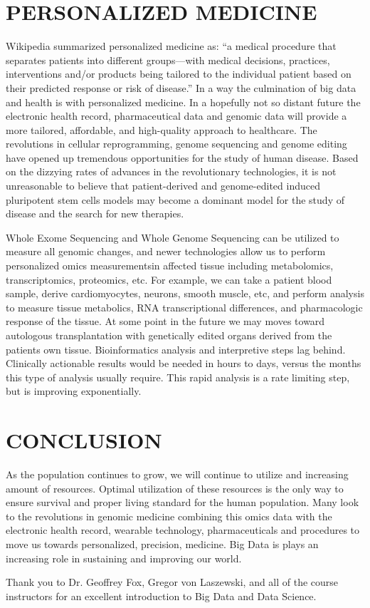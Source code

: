\documentclass[sigconf]{acmart}
\begin{document}
\section{PERSONALIZED MEDICINE}

Wikipedia summarized personalized medicine as: ``a medical
procedure that separates patients into different groups—with medical
decisions, practices, interventions and/or products being tailored to
the individual patient based on their predicted response or risk of
disease.''  \cite{wiki-personalized} In a way the culmination of big
data and health is with personalized medicine.  In a hopefully not so
distant future the electronic health record, pharmaceutical data and
genomic data will provide a more tailored, affordable, and
high-quality approach to healthcare. 
The revolutions in cellular reprogramming, genome sequencing and genome editing have opened up tremendous opportunities for the study of human disease.  Based on the dizzying rates of advances in the  revolutionary technologies, it is not unreasonable to believe that patient-derived and genome-edited  induced pluripotent stem cells models may become a dominant model for the study of  disease and the search for new therapies.

Whole Exome Sequencing and Whole Genome Sequencing  can be utilized to measure all genomic changes, and newer technologies allow us to perform personalized omics measurementsin affected tissue including metabolomics, transcriptomics, proteomics, etc.  For example, we can take a patient blood sample, derive cardiomyocytes, neurons, smooth muscle, etc, and perform analysis to measure tissue metabolics, RNA transcriptional differences, and pharmacologic response of the tissue. At some point in the future we may moves toward autologous transplantation with genetically edited organs derived from the patients own tissue.   
Bioinformatics analysis and interpretive steps lag behind.  Clinically actionable results would be needed in hours to days, versus the months this type of analysis usually require.  This rapid analysis  is a rate limiting step, but is improving exponentially. 

\section{CONCLUSION}
As the population continues to grow, we will continue to utilize and increasing amount of resources.  Optimal utilization of these resources is the only way to ensure survival and proper living standard for the human population.  Many look to the revolutions in genomic medicine combining this omics data with the electronic health record, wearable technology, pharmaceuticals and procedures to move us towards personalized, precision, medicine.  Big Data is plays an increasing role in sustaining and improving our world.  

\begin{acks}

Thank you to Dr. Geoffrey Fox, Gregor von Laszewski, and all of the
course instructors for an excellent introduction to Big Data and Data
Science.

\end{acks}



 
\end{document}

